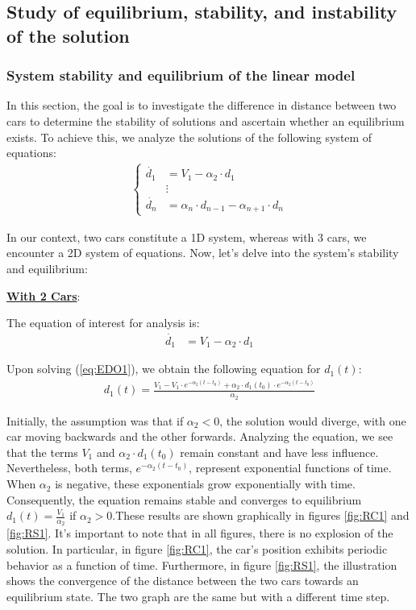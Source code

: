 \documentclass{article}
\begin{document}
		\subsection{Study of equilibrium, stability, and instability of the solution}
		\subsubsection{System stability and equilibrium of the linear model}
		In this section, the goal is to investigate the difference in distance between two cars to determine the stability of solutions and ascertain whether an equilibrium exists. To achieve this, we analyze the solutions of the following system of equations:
		\begin{align*}
			\begin{cases}
				\dot{d_1} &= V_1 - \alpha_2 \cdot d_1 \\
				&\vdots \\
				\dot{d_n} &= \alpha_n \cdot d_{n-1} - \alpha_{n+1} \cdot d_n
			\end{cases}
		\end{align*}
		
		In our context, two cars constitute a 1D system, whereas with 3 cars, we encounter a 2D system of equations. Now, let's delve into the system's stability and equilibrium: \newline
		
		\textbf{\underline{With 2 Cars}}:
		
		The equation of interest for analysis is:
		\begin{align*}
			\dot{d_1} &= V_1 - \alpha_2 \cdot d_1
		\end{align*}
		
		Upon solving (\ref{eq:EDO1}), we obtain the following equation for \(d_1(t)\):
		\begin{align*}
			\boxed{d_1(t) = \frac{{V_1 - V_1 \cdot e^{-\alpha_2(t-t_0)} + \alpha_2 \cdot d_1(t_0) \cdot e^{-\alpha_2(t-t_0)}}}{\alpha_2}}
		\end{align*}
		
		Initially, the assumption was that if $\alpha_2 < 0$, the solution would diverge, with one car moving backwards and the other forwards. Analyzing the equation, we see that the terms $V_1$ and $\alpha_2 \cdot d_1(t_0)$ remain constant and have less influence. Nevertheless, both terms, $e^{-\alpha_2(t-t_0)}$, represent exponential functions of time. When $\alpha_2$ is negative, these exponentials grow exponentially with time. Consequently, the equation remains stable and converges to equilibrium $\boxed{d_1(t)=\frac{V_1}{\alpha_2}}$ if $\alpha_2 > 0$.These results are shown graphically in figures \ref{fig:RC1} and \ref{fig:RS1}. It's important to note that in all figures, there is no explosion of the solution. In particular, in figure \ref{fig:RC1}, the car's position exhibits periodic behavior as a function of time. Furthermore, in figure \ref{fig:RS1}, the illustration shows the convergence of the distance between the two cars towards an equilibrium state. The two graph are the same but with a different time step.
		
\end{document}
